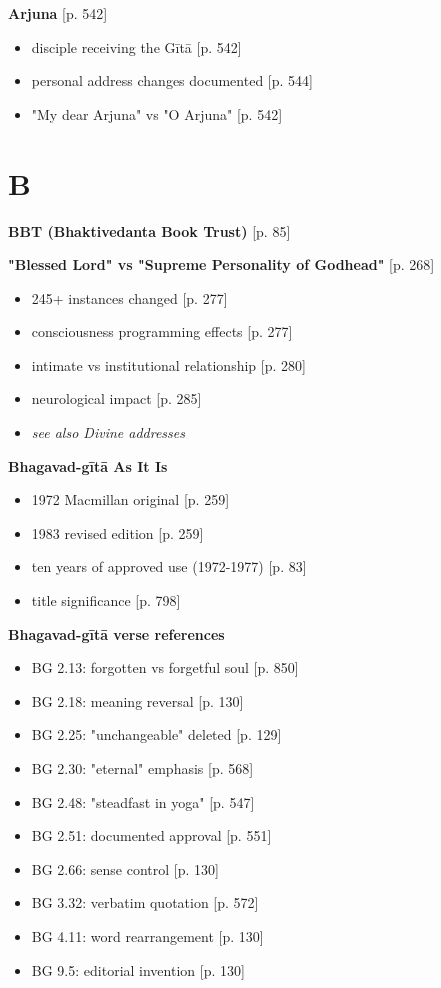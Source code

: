 \documentclass[11pt,twoside]{book}
\begin{document}
\textbf{\textbf{Arjuna}} {[}p. 542]
\begin{itemize}
\item disciple receiving the Gītā [p. 542]
\item personal address changes documented [p. 544]
\item "My dear Arjuna" vs "O Arjuna" [p. 542]
\end{itemize}
\section*{B}
\label{sec:org0514e20}

\textbf{\textbf{BBT (Bhaktivedanta Book Trust)}} {[}p. 85]

\textbf{\textbf{"Blessed Lord" vs "Supreme Personality of Godhead"}} {[}p. 268]
\begin{itemize}
\item 245+ instances changed [p. 277]
\item consciousness programming effects [p. 277]
\item intimate vs institutional relationship [p. 280]
\item neurological impact [p. 285]
\item \emph{see also Divine addresses}
\end{itemize}

\textbf{\textbf{Bhagavad-gītā As It Is}}
\begin{itemize}
\item 1972 Macmillan original [p. 259]
\item 1983 revised edition [p. 259]
\item ten years of approved use (1972-1977) [p. 83]
\item title significance [p. 798]
\end{itemize}

\textbf{\textbf{Bhagavad-gītā verse references}}
\begin{itemize}
\item BG 2.13: forgotten vs forgetful soul [p. 850]
\item BG 2.18: meaning reversal [p. 130]
\item BG 2.25: "unchangeable" deleted [p. 129]
\item BG 2.30: "eternal" emphasis [p. 568]
\item BG 2.48: "steadfast in yoga" [p. 547]
\item BG 2.51: documented approval [p. 551]
\item BG 2.66: sense control [p. 130]
\item BG 3.32: verbatim quotation [p. 572]
\item BG 4.11: word rearrangement [p. 130]
\item BG 9.5: editorial invention [p. 130]
\end{itemize}
\end{document}
